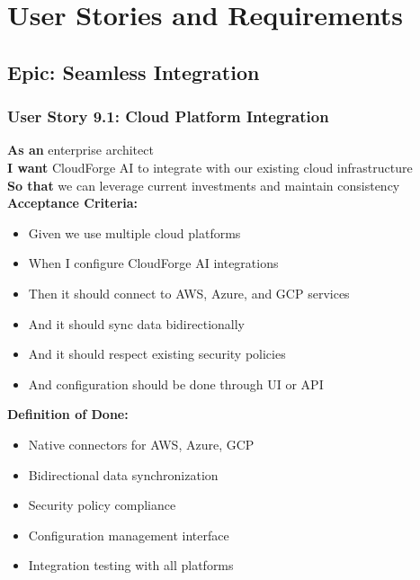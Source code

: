 \section{User Stories and Requirements}

\subsection{Epic: Seamless Integration}

\subsubsection{User Story 9.1: Cloud Platform Integration}

\begin{tcolorbox}[colback=lightgray, colframe=primaryblue, title=US-9.1: Cloud Platform Integration]
\textbf{As an} enterprise architect \\
\textbf{I want} CloudForge AI to integrate with our existing cloud infrastructure \\
\textbf{So that} we can leverage current investments and maintain consistency \\

\textbf{Acceptance Criteria:}
\begin{itemize}
    \item Given we use multiple cloud platforms
    \item When I configure CloudForge AI integrations
    \item Then it should connect to AWS, Azure, and GCP services
    \item And it should sync data bidirectionally
    \item And it should respect existing security policies
    \item And configuration should be done through UI or API
\end{itemize}

\textbf{Definition of Done:}
\begin{itemize}
    \item Native connectors for AWS, Azure, GCP
    \item Bidirectional data synchronization
    \item Security policy compliance
    \item Configuration management interface
    \item Integration testing with all platforms
\end{itemize}
\end{tcolorbox}

